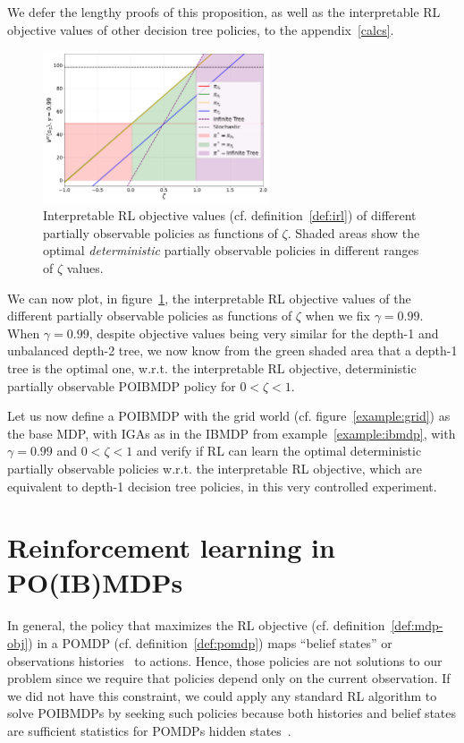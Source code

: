 We defer the lengthy proofs of this proposition, as well as the interpretable RL objective values of other decision tree policies, to the appendix~\ref{calcs}.

\begin{figure}
    \centering
    \includegraphics[width=0.6\textwidth]{images/images_part1/objective_values_plot.pdf}
    \caption{Interpretable RL objective values (cf. definition~\ref{def:irl}) of different partially observable policies as functions of $\zeta$. Shaded areas show the optimal \textit{deterministic} partially observable policies in different ranges of $\zeta$ values.}\label{fig:irl-objectives}
\end{figure}

We can now plot, in figure~\ref{fig:irl-objectives}, the interpretable RL objective values of the different partially observable policies as functions of $\zeta$ when we fix $\gamma=0.99$. 
When $\gamma=0.99$, despite objective values being very similar for the depth-1 and unbalanced depth-2 tree, we now know from the green shaded area that a depth-1 tree is the optimal one, w.r.t. the interpretable RL objective, deterministic partially observable POIBMDP policy for $0< \zeta < 1$.

Let us now define a POIBMDP with the grid world (cf. figure~\ref{example:grid}) as the base MDP, with IGAs as in the IBMDP from example~\ref{example:ibmdp}, with $\gamma=0.99$ and $0<\zeta<1$ and verify if RL can learn the optimal deterministic partially observable policies w.r.t. the interpretable RL objective, which are equivalent to depth-1 decision tree policies, in this very controlled experiment.

\section{Reinforcement learning in PO(IB)MDPs}

In general, the policy that maximizes the RL objective (cf. definition~\ref{def:mdp-obj}) in a POMDP (cf. definition~\ref{def:pomdp}) maps ``belief states'' or observations histories~\cite{chap2} to actions. Hence, those policies are not solutions to our problem since we require that policies depend only on the current observation.
If we did not have this constraint, we could apply any standard RL algorithm to solve POIBMDPs by seeking such policies because both histories and belief states are sufficient statistics for POMDPs hidden states~\cite{chap2,lambrechts2025informed}.

